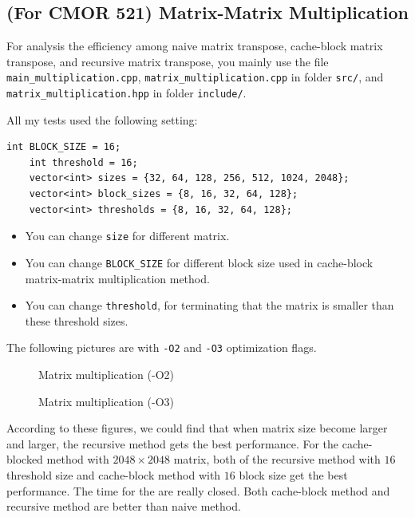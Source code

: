\documentclass[11pt]{article}
\begin{document}
\subsection{(For CMOR 521)  Matrix-Matrix Multiplication}
For analysis the efficiency among naive matrix transpose, cache-block matrix transpose, and recursive matrix transpose, you mainly use the file \verb|main_multiplication.cpp|, \verb|matrix_multiplication.cpp| in folder \texttt{src/}, and \verb|matrix_multiplication.hpp| in folder \texttt{include/}.

All my tests used the following setting:

\begin{lstlisting}[style=C++Style]
    int BLOCK_SIZE = 16;  
    int threshold = 16; 
    vector<int> sizes = {32, 64, 128, 256, 512, 1024, 2048};
    vector<int> block_sizes = {8, 16, 32, 64, 128};
    vector<int> thresholds = {8, 16, 32, 64, 128};
\end{lstlisting}
\begin{itemize}
    \item You can change \verb|size| for different matrix.
    \item You can change \verb|BLOCK_SIZE| for different block size used in cache-block matrix-matrix multiplication method.
    \item You can change \verb|threshold|, for terminating that the matrix is smaller than these threshold sizes. 
\end{itemize}

The following pictures are with \verb|-O2| and \verb|-O3| optimization flags.
\begin{figure}[H]
    \centering
    
    \caption{Matrix multiplication (-O2)}
    \label{fig5:Matrix multiplication (-O2)}
\end{figure}

\begin{figure}[H]
    \centering
    
    \caption{Matrix multiplication (-O3)}
    \label{fig6:Matrix multiplication (-O3)}
\end{figure}

According to these figures, we could find that when matrix size become larger and larger, the recursive method gets the best performance. For the cache-blocked method with $2048 \times 2048$ matrix, both of the recursive method with $16$threshold size and cache-block method with $16$ block size get the best performance. The time for the are really closed. Both cache-block method and recursive method are better than naive method.
\end{document}
